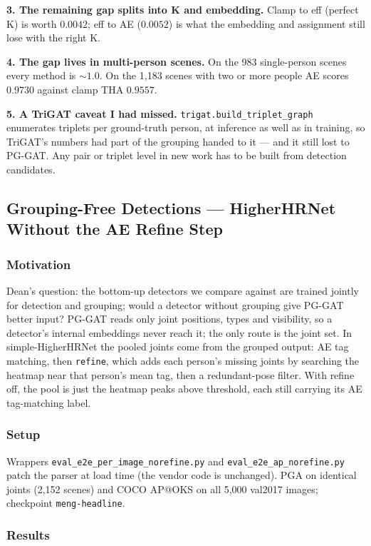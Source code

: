 \textbf{3. The remaining gap splits into K and embedding.} Clamp to eff (perfect K) is worth $0.0042$; eff to AE ($0.0052$) is what the embedding and assignment still lose with the right K.

\textbf{4. The gap lives in multi-person scenes.} On the 983 single-person scenes every method is $\sim\!1.0$. On the 1,183 scenes with two or more people AE scores $0.9730$ against clamp THA $0.9557$.

\textbf{5. A TriGAT caveat I had missed.} \texttt{trigat.build\_triplet\_graph} enumerates triplets per ground-truth person, at inference as well as in training, so TriGAT's numbers had part of the grouping handed to it --- and it still lost to PG-GAT. Any pair or triplet level in new work has to be built from detection candidates.

\subsection{Grouping-Free Detections --- HigherHRNet Without the AE Refine Step}

\subsubsection{Motivation}

Dean's question: the bottom-up detectors we compare against are trained jointly for detection and grouping; would a detector without grouping give PG-GAT better input?
PG-GAT reads only joint positions, types and visibility, so a detector's internal embeddings never reach it; the only route is the joint set.
In simple-HigherHRNet the pooled joints come from the grouped output: AE tag matching, then \texttt{refine}, which adds each person's missing joints by searching the heatmap near that person's mean tag, then a redundant-pose filter.
With refine off, the pool is just the heatmap peaks above threshold, each still carrying its AE tag-matching label.

\subsubsection{Setup}

Wrappers \texttt{eval\_e2e\_per\_image\_norefine.py} and \texttt{eval\_e2e\_ap\_norefine.py} patch the parser at load time (the vendor code is unchanged).
PGA on identical joints (2,152 scenes) and COCO AP@OKS on all 5,000 val2017 images; checkpoint \texttt{meng-headline}.

\subsubsection{Results}

